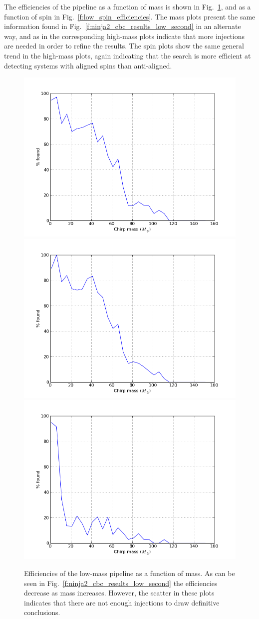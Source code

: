The efficiencies of the pipeline as a function of mass is shown in
Fig.~\ref{f:low_mass_efficiencies}, and as a function of spin in
Fig.~\ref{f:low_spin_efficiencies}.  The mass plots present the
same information found in Fig.~\ref{f:ninja2_cbc_results_low_second}
in an alternate way, and as in the corresponding high-mass plots
indicate that more injections are needed in order to refine the
results.  The spin plots show the same general trend in the high-mass
plots, again indicating that the search is more efficient at detecting
systems with aligned spins than anti-aligned.

\begin{figure}
  \includegraphics[width=0.5\linewidth]{figures/ninja2_results/H_second_mass_low_efficiency}
  \includegraphics[width=0.5\linewidth]{figures/ninja2_results/L_second_mass_low_efficiency} \\
  \includegraphics[width=0.5\linewidth]{figures/ninja2_results/V_second_mass_low_efficiency}
  \caption[Efficiency of the low-mass pipeline as a function of mass]{
  \label{f:low_mass_efficiencies}
Efficiencies of the low-mass pipeline as a function of mass.  As
can be seen in Fig.~\ref{f:ninja2_cbc_results_low_second} the
efficiencies decrease as mass increases.  However, the scatter in
these plots indicates that there are not enough injections to draw
definitive conclusions.
}
\end{figure}%

